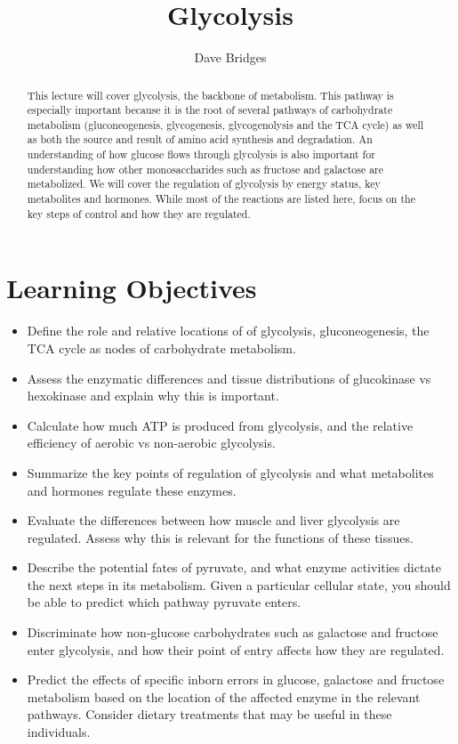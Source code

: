 \documentclass{tufte-handout}
\title{Glycolysis}
\author{Dave Bridges}
\begin{document}
\maketitle%

\begin{abstract}
\noindent This lecture will cover glycolysis, the backbone of metabolism.  This pathway is especially important because it is the root of several pathways of carbohydrate metabolism (gluconeogenesis, glycogenesis, glycogenolysis and the TCA cycle) as well as both the source and result of amino acid synthesis and degradation.  An understanding of how glucose flows through glycolysis is also important for understanding how other monosaccharides such as fructose and galactose are metabolized.  We will cover the regulation of glycolysis by energy status, key metabolites and hormones.  While most of the reactions are listed here, focus on the key steps of control and how they are regulated.  
\end{abstract}

\tableofcontents
\pagebreak
\section{Learning Objectives}

\begin{itemize}
\item Define the role and relative locations of of glycolysis, gluconeogenesis, the TCA cycle as nodes of carbohydrate metabolism.
\item Assess the enzymatic differences and tissue distributions of glucokinase vs hexokinase and explain why this is important.
\item Calculate how much ATP is produced from glycolysis, and the relative efficiency of aerobic vs non-aerobic glycolysis.
\item Summarize the key points of regulation of glycolysis and what metabolites and hormones regulate these enzymes.
\item Evaluate the differences between how muscle and liver glycolysis are regulated.  Assess why this is relevant for the functions of these tissues.
\item Describe the potential fates of pyruvate, and what enzyme activities dictate the next steps in its metabolism.  Given a particular cellular state, you should be able to predict which pathway pyruvate enters.
\item Discriminate how non-glucose carbohydrates such as galactose and fructose enter glycolysis, and how their point of entry affects how they are regulated.
\item Predict the effects of specific inborn errors in glucose, galactose and fructose metabolism based on the location of the affected  enzyme in the relevant pathways.  Consider dietary treatments that may be useful in these individuals.

\end{itemize}
\end{document}
